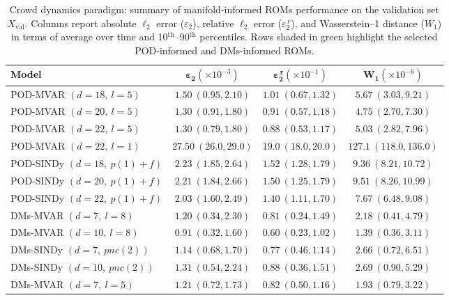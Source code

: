 \documentclass{article}
\begin{document}
\begin{table}[ht]
\centering
\setlength{\tabcolsep}{2pt}
{
\small
\begin{tabularx}{\textwidth}{lCCC}  
\toprule
\textbf{Model} & $\boldsymbol{\varepsilon_2} (\times 10^{-3})$ & $\boldsymbol{\varepsilon_2^{\,r}} (\times 10^{-1})$ & $\boldsymbol{W_1}  (\times 10^{-6})$ \\
\midrule
POD-MVAR $(d=18,\ l=5)$ & $1.50~(0.95,2.10)$ & $1.01~(0.67,1.32)$  & $5.67~(3.03,9.21)$ \\
POD-MVAR $(d=20,\ l=5)$ & $1.30~(0.91,1.80)$ & $0.91~(0.57,1.18)$  & $4.75~(2.70,7.30)$ \\
POD-MVAR $(d=22,\ l=5)$ & $1.30~(0.79,1.80)$ & $0.88~(0.53,1.17)$  & $5.03~(2.82,7.96)$ \\

POD-MVAR $(d=22, \ l=1)$ & $27.50~(26.0,29.0)$ & $19.0~(18.0,20.0)$ & $127.1~(118.0,136.0)$\\

POD-SINDy $(d=18, \ p(1)+f)$ & $2.23~(1.85,2.64)$ & $1.52~(1.28,1.79)$ & $9.36~(8.21,10.72)$\\
POD-SINDy $(d=20, \ p(1)+f)$ & $2.21~(1.84,2.66)$ & $1.50~(1.25,1.79)$ & $9.51~(8.26,10.99)$\\
POD-SINDy $(d=22, \ p(1)+f)$ & $2.03~(1.60,2.49)$ & $1.40~(1.11,1.70)$ & $7.67~(6.48,9.08)$\\
DMs-MVAR $(d=7,\ l=8)$  & $1.20~(0.34, 2.30)$ & $0.81~(0.24,1.49)$  & $2.18~(0.41,4.79)$\\
DMs-MVAR $(d=10,\ l=8)$ & $ 0.91~(0.32, 1.60)$ & $0.60~(0.23,1.02)$  & $1.39~(0.36,3.11)$\\
DMs-SINDy $(d=7, \ pnc(2))$ & $1.14~(0.68,1.70)$ & $0.77~(0.46,1.14)$ & $2.66~(0.72,6.51)$\\
DMs-SINDy $(d=10, \ pnc(2))$ & $1.31~(0.54,2.24)$ & $0.88~(0.36,1.51)$ & $2.69~(0.90,5.29)$\\
DMs-MVAR $(d=7, \ l=5)$ & $1.21~(0.72,1.73)$ & $0.82~(0.50,1.16)$ & $1.93~(0.79,3.22)$\\
\bottomrule
\end{tabularx}
}
\caption{Crowd dynamics paradigm: summary of manifold-informed ROMs performance on the validation set \(X_{\text{val}}\). Columns report absolute $\ell_2$ error ($\varepsilon_2$), relative $\ell_2$ error ($\varepsilon_2^{\,r}$), and Wasserstein–1 distance ($W_1$) in terms of average over time and 10$^{\text{th}}$–90$^{\text{th}}$ percentiles. Rows shaded in green highlight the selected POD-informed and DMs-informed ROMs.}
\label{tab:rom_metrics_validation}
\end{table}
\end{document}
